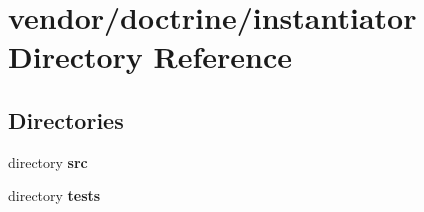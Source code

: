\section{vendor/doctrine/instantiator Directory Reference}
\label{dir_88f0a93d47e79467c56708e97c571f01}
\subsection*{Directories}
\begin{DoxyCompactItemize}
\item 
directory {\bf src}
\item 
directory {\bf tests}
\end{DoxyCompactItemize}
